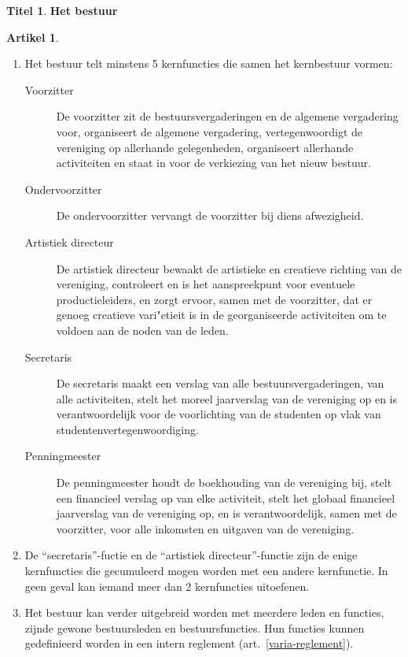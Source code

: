 \documentclass[a4paper,10pt]{article}
\theoremstyle{definition}
\newtheorem{titel}{\newline\Large Titel}
\newtheorem{artikelbase}{\large Artikel}
\newenvironment{artikel}
  {\begin{artikelbase}}
  {\smallskip
   \end{artikelbase}}
\newcommand{\ttext}[1]{\Large \textbf{#1} \normalsize}
\newcommand{\ttextenum}{\mbox{}}
\begin{document}

\begin{titel}\ttext{Het bestuur}

  \begin{artikel}\ttextenum
    \begin{enumerate}
      \item Het bestuur telt minstens 5 kernfuncties die samen het kernbestuur vormen:
      \begin{description}
        \item[Voorzitter]
          De voorzitter zit de bestuursvergaderingen en de algemene vergadering voor, organiseert de algemene vergadering, vertegenwoordigt de vereniging op allerhande gelegenheden, organiseert allerhande activiteiten en staat in voor de verkiezing van het nieuw bestuur.
        \item[Ondervoorzitter]
          De ondervoorzitter vervangt de voorzitter bij diens afwezigheid.
        \item[Artistiek directeur]
          De artistiek directeur bewaakt de artistieke en creatieve richting van de vereniging, controleert en is het aanspreekpunt voor eventuele productieleiders, en zorgt ervoor, samen met de voorzitter, dat er genoeg creatieve vari"etieit is in de georganiseerde activiteiten om te voldoen aan de noden van de leden.
        \item[Secretaris]
          De secretaris maakt een verslag van alle bestuursvergaderingen, van alle activiteiten, stelt het moreel jaarverslag van de vereniging op en is verantwoordelijk voor de voorlichting van de studenten op vlak van studentenvertegenwoordiging.
        \item[Penningmeester]
          De penningmeester houdt de boekhouding van de vereniging bij, stelt een financieel verslag op van elke activiteit, stelt het globaal financieel jaarverslag van de vereniging op, en is verantwoordelijk, samen met de voorzitter, voor alle inkomsten en uitgaven van de vereniging.
      \end{description}

      \item
        De ``secretaris''-fuctie en de ``artistiek directeur''-functie zijn de enige kernfuncties die gecumuleerd mogen worden met een andere kernfunctie.
        In geen geval kan iemand meer dan 2 kernfuncties uitoefenen.
      \item Het bestuur kan verder uitgebreid worden met meerdere leden en functies, zijnde gewone bestuursleden en bestuursfuncties.
        Hun functies kunnen gedefinieerd worden in een intern reglement (art.~\ref{varia-reglement}).
    \end{enumerate}
  \end{artikel}


\end{titel}
\end{document}
